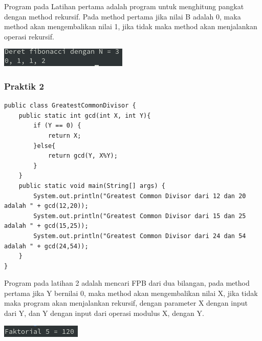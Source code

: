 \documentclass[a4paper,12pt]{article}
\begin{document}
Program pada Latihan pertama adalah program untuk menghitung pangkat dengan method rekursif. Pada method pertama jika
nilai B adalah 0, maka method akan mengembalikan nilai 1, jika tidak maka method akan menjalankan operasi rekursif.

\begin{center}
    \includegraphics[scale=1]{4.png} 
\end{center}

\subsubsection{Praktik 2}
\begin{lstlisting}
public class GreatestCommonDivisor {
    public static int gcd(int X, int Y){
    	if (Y == 0) {
    		return X;
    	}else{
    		return gcd(Y, X%Y);
    	}
    }
    public static void main(String[] args) {
    	System.out.println("Greatest Common Divisor dari 12 dan 20 adalah " + gcd(12,20));
    	System.out.println("Greatest Common Divisor dari 15 dan 25 adalah " + gcd(15,25));
    	System.out.println("Greatest Common Divisor dari 24 dan 54 adalah " + gcd(24,54));
    }
}
\end{lstlisting}
Program pada latihan 2 adalah mencari FPB dari dua bilangan, pada method pertama jika Y bernilai 0, maka method akan
mengembalikan nilai X, jika tidak maka program akan menjalankan rekursif, dengan parameter X dengan input dari Y, dan Y
dengan input dari operasi modulus X, dengan Y.

\begin{center}
    \includegraphics[scale=1]{5.png} 
\end{center}

\newpage
\end{document}
